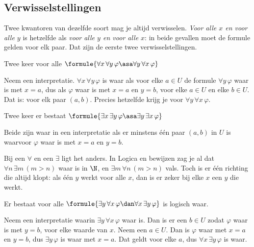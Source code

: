 \begin{oefeningen}
\end{oefeningen}

\subsection{Verwisselstellingen}

Twee kwantoren van dezelfde soort mag je altijd verwisselen. \textit{Voor alle $x$ en voor alle $y$} is hetzelfde als \textit{voor alle $y$ en voor alle $x$}: in beide gevallen moet de formule gelden voor elk paar. Dat zijn de eerste twee verwisselstellingen.

\begin{theorie}
\begin{stelling}{Twee keer voor alle}
\qquad $\formule{\forall x\, \forall y\, \varphi \asa \forall y\, \forall x\, \varphi}$
\end{stelling}

\begin{bewijs}
Neem een interpretatie. $\forall x\, \forall y\, \varphi$ is waar als voor elke $a \in U$ de formule $\forall y\, \varphi$ waar is met $x = a$, dus als $\varphi$ waar is met $x = a$ en $y = b$, voor elke $a \in U$ en elke $b \in U$. Dat is: voor elk paar $(a, b)$. Precies hetzelfde krijg je voor $\forall y\, \forall x\, \varphi$.
\end{bewijs}

\begin{stelling}{Twee keer er bestaat}
\qquad $\formule{\exists x\, \exists y\, \varphi \asa \exists y\, \exists x\, \varphi}$
\end{stelling}

\begin{bewijs}
Beide zijn waar in een interpretatie als er minstens één paar $(a, b)$ in $U$ is waarvoor $\varphi$ waar is met $x = a$ en $y = b$.
\end{bewijs}
\end{theorie}

Bij een $\forall$ en een $\exists$ ligt het anders. In Logica en bewijzen zag je al dat $\forall n\, \exists m\, (m > n)$ waar is in $\N$, en $\exists m\, \forall n\, (m > n)$ vals. Toch is er één richting die altijd klopt: als één $y$ werkt voor alle $x$, dan is er zeker bij elke $x$ een $y$ die werkt.

\begin{theorie}
\begin{stelling}{Er bestaat voor alle}
\qquad $\formule{\exists y\, \forall x\, \varphi \dan \forall x\, \exists y\, \varphi}$ \qquad is logisch waar.
\end{stelling}

\begin{bewijs}
Neem een interpretatie waarin $\exists y\, \forall x\, \varphi$ waar is. Dan is er een $b \in U$ zodat $\varphi$ waar is met $y = b$, voor elke waarde van $x$. Neem een $a \in U$. Dan is $\varphi$ waar met $x = a$ en $y = b$, dus $\exists y\, \varphi$ is waar met $x = a$. Dat geldt voor elke $a$, dus $\forall x\, \exists y\, \varphi$ is waar.
\end{bewijs}
\end{theorie}

